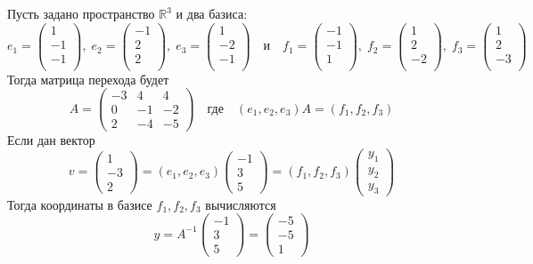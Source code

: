 \documentclass{article}
\begin{document}
Пусть задано пространство $\mathbb R^3$ и два базиса:
\[
e_{{1}} = \begin{pmatrix}
{1}\\
{-1}\\
{-1}\\
\end{pmatrix},\;e_{{2}} = \begin{pmatrix}
{-1}\\
{2}\\
{2}\\
\end{pmatrix},\;e_{{3}} = \begin{pmatrix}
{1}\\
{-2}\\
{-1}\\
\end{pmatrix}
\quad\text{и}\quad
f_{{1}} = \begin{pmatrix}
{-1}\\
{-1}\\
{1}\\
\end{pmatrix},\;f_{{2}} = \begin{pmatrix}
{1}\\
{2}\\
{-2}\\
\end{pmatrix},\;f_{{3}} = \begin{pmatrix}
{1}\\
{2}\\
{-3}\\
\end{pmatrix}
\]
Тогда матрица перехода будет
\[
A =
\begin{pmatrix}
-3&4&4\\
0&-1&-2\\
2&-4&-5
\end{pmatrix}
\quad
\text{где}\quad
(e_1, e_2, e_3) A = (f_1, f_2, f_3)
\]
Если дан вектор
\[
v =
\begin{pmatrix}
1\\-3\\2
\end{pmatrix}
=
(e_1, e_2, e_3)
\begin{pmatrix}
-1\\3\\5
\end{pmatrix}
=
(f_1, f_2, f_3)
\begin{pmatrix}
y_1\\y_2\\y_3
\end{pmatrix}
\]
Тогда координаты в базисе $f_1, f_2, f_3$ вычисляются
\[
y=
A^{-1}
\begin{pmatrix}
-1\\3\\5
\end{pmatrix}
=
\begin{pmatrix}
-5\\-5\\1
\end{pmatrix}
\]
\end{document}
